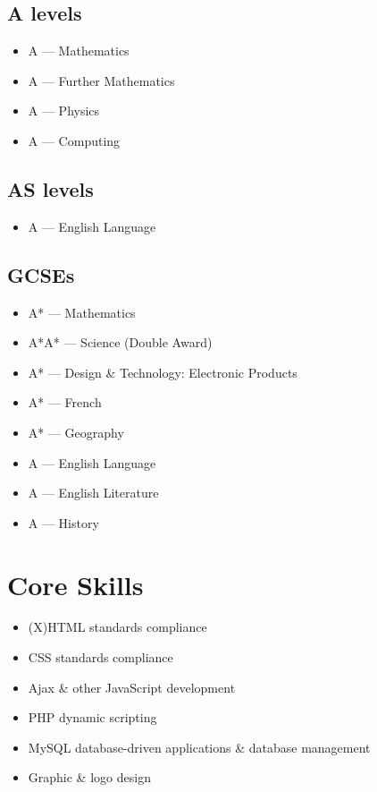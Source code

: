 \documentclass{cv}
\begin{document}
\subsection*{A levels}

\begin{itemize}
\item A --- Mathematics
\item A --- Further Mathematics
\item A --- Physics
\item A --- Computing
\end{itemize}

\subsection*{AS levels}

\begin{itemize}
\item A --- English Language
\end{itemize}

\subsection*{GCSEs}

\begin{itemize}
\item A* --- Mathematics
\item A*A* --- Science (Double Award)
\item A* --- Design \& Technology: Electronic Products
\item A* --- French
\item A* --- Geography
\item A --- English Language
\item A --- English Literature
\item A --- History
\end{itemize}

\section{Core Skills}

\begin{itemize}
\item (X)HTML standards compliance
\item CSS standards compliance
\item Ajax \& other JavaScript development
\item PHP dynamic scripting
\item MySQL database-driven applications \& database management
\item Graphic \& logo design
\end{itemize}
\end{document}
